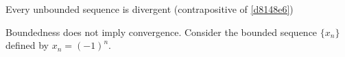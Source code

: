 \label{a46c1d7}

\begin{enumerati}
  \item Every unbounded sequence is divergent (contrapositive of
        \autoref{d8148e6})
  \item Boundedness does not imply convergence. Consider the bounded sequence
        $\{x_n\}$ defined by $x_n=(-1)^n$.
\end{enumerati}
